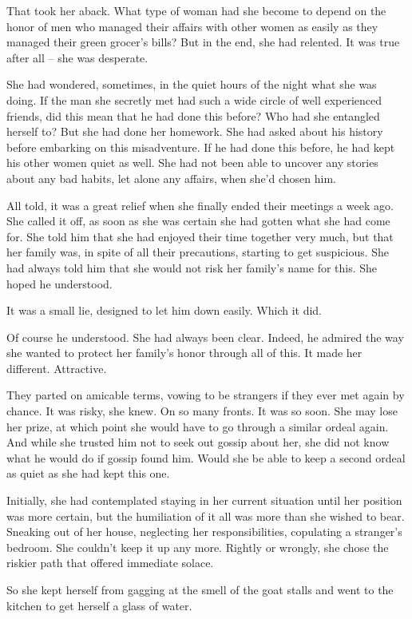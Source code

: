 \documentclass{article}
\begin{document}
That took her aback. What type of woman had she become to depend on the honor of men who managed their affairs with other women as easily as they managed their green grocer's bills? But in the end, she had relented. It was true after all -- she was desperate.  

She had wondered, sometimes, in the quiet hours of the night what she was doing. If the man she secretly met had such a wide circle of well experienced friends, did this mean that he had done this before? Who had she entangled herself to? But she had done her homework. She had asked about his history before embarking on this misadventure. If he had done this before, he had kept his other women quiet as well. She had not been able to uncover any stories about any bad habits, let alone any affairs, when she'd chosen him.

All told, it was a great relief when she finally ended their meetings a week ago. She called it off, as soon as she was certain she had gotten what she had come for. She told him that she had enjoyed their time together very much, but that her family was, in spite of all their precautions, starting to get suspicious. She had always told him that she would not risk her family's name for this. She hoped he understood. 

It was a small lie, designed to let him down easily. Which it did.

Of course he understood. She had always been clear. Indeed, he admired the way she wanted to protect her family's honor through all of this. It made her different. Attractive. 

They parted on amicable terms, vowing to be strangers if they ever met again by chance. It was risky, she knew. On so many fronts. It was so soon. She may lose her prize, at which point she would have to go through a similar ordeal again. And while she trusted him not to seek out gossip about her, she did not know what he would do if gossip found him. Would she be able to keep a second ordeal as quiet as she had kept this one. 

Initially, she had contemplated staying in her current situation until her position was more certain, but the humiliation of it all was more than she wished to bear. Sneaking out of her house, neglecting her responsibilities, copulating a stranger's bedroom. She couldn't keep it up any more. Rightly or wrongly, she chose the riskier path that offered immediate solace. 

So she kept herself from gagging at the smell of the goat stalls and went to the kitchen to get herself a glass of water.
\end{document}
